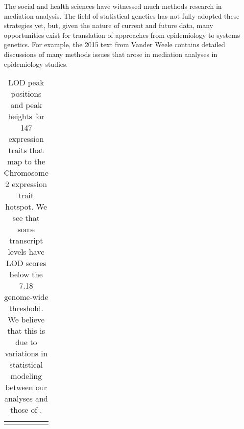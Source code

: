\documentclass{book}
\begin{document}
The social and health sciences have witnessed much methods research in  mediation analysis. The field of statistical genetics has not fully adopted these strategies yet, but, given the nature of current and future data, many opportunities exist for translation of approaches from epidemiology to systems genetics. For example, the 2015 text from Vander Weele contains detailed discussions of many methods issues that arose in mediation analyses in epidemiology studies.





{\tiny
\begin{longtable}{lrr}
\caption{LOD peak positions and peak heights for 147 expression traits that map to the Chromosome 2 expression trait hotspot. We see that some transcript levels have LOD scores below the 7.18 genome-wide threshold. We believe that this is due to variations in statistical modeling between our analyses and those of \citet{keller2018genetic}.}\\ 
\hline \\


\end{longtable}}
\end{document}
